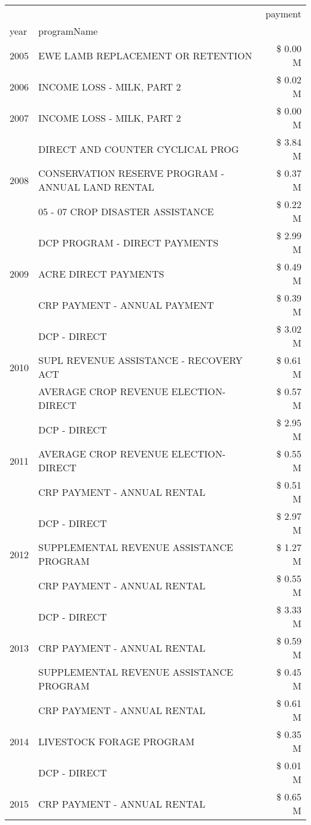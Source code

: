 \begin{tabular}{llr}
\toprule
 &  & payment \\
year & programName &  \\
\midrule
2005 & EWE LAMB REPLACEMENT OR RETENTION & \$ 0.00 M \\
\cline{1-3}
2006 & INCOME LOSS - MILK, PART 2 & \$ 0.02 M \\
\cline{1-3}
2007 & INCOME LOSS - MILK, PART 2 & \$ 0.00 M \\
\cline{1-3}
\multirow[t]{3}{*}{2008} & DIRECT AND COUNTER CYCLICAL PROG & \$ 3.84 M \\
 & CONSERVATION RESERVE PROGRAM - ANNUAL LAND RENTAL & \$ 0.37 M \\
 & 05 - 07 CROP DISASTER ASSISTANCE & \$ 0.22 M \\
\cline{1-3}
\multirow[t]{3}{*}{2009} & DCP PROGRAM - DIRECT PAYMENTS & \$ 2.99 M \\
 & ACRE DIRECT PAYMENTS & \$ 0.49 M \\
 & CRP PAYMENT - ANNUAL PAYMENT & \$ 0.39 M \\
\cline{1-3}
\multirow[t]{3}{*}{2010} & DCP - DIRECT & \$ 3.02 M \\
 & SUPL REVENUE ASSISTANCE - RECOVERY ACT & \$ 0.61 M \\
 & AVERAGE CROP REVENUE ELECTION-DIRECT & \$ 0.57 M \\
\cline{1-3}
\multirow[t]{3}{*}{2011} & DCP - DIRECT & \$ 2.95 M \\
 & AVERAGE CROP REVENUE ELECTION-DIRECT & \$ 0.55 M \\
 & CRP PAYMENT - ANNUAL RENTAL & \$ 0.51 M \\
\cline{1-3}
\multirow[t]{3}{*}{2012} & DCP - DIRECT & \$ 2.97 M \\
 & SUPPLEMENTAL REVENUE ASSISTANCE PROGRAM & \$ 1.27 M \\
 & CRP PAYMENT - ANNUAL RENTAL & \$ 0.55 M \\
\cline{1-3}
\multirow[t]{3}{*}{2013} & DCP - DIRECT & \$ 3.33 M \\
 & CRP PAYMENT - ANNUAL RENTAL & \$ 0.59 M \\
 & SUPPLEMENTAL REVENUE ASSISTANCE PROGRAM & \$ 0.45 M \\
\cline{1-3}
\multirow[t]{3}{*}{2014} & CRP PAYMENT - ANNUAL RENTAL & \$ 0.61 M \\
 & LIVESTOCK FORAGE PROGRAM & \$ 0.35 M \\
 & DCP - DIRECT & \$ 0.01 M \\
\cline{1-3}
\multirow[t]{3}{*}{2015} & CRP PAYMENT - ANNUAL RENTAL & \$ 0.65 M \\

\end{tabular}
